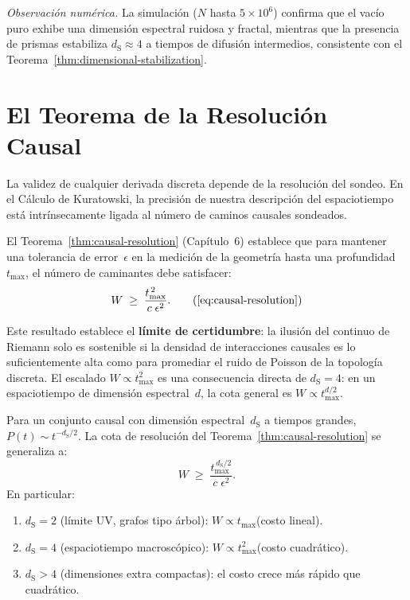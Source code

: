 \documentclass[11pt, a4paper, openany]{book}
\newcommand{\dS}{d_{\mathrm{S}}}
\begin{document}
\noindent\textit{Observaci\'on num\'erica.}\enspace
La simulaci\'on ($N$ hasta $5 \times 10^6$) confirma que el vac\'io
puro exhibe una dimensi\'on espectral ruidosa y fractal, mientras que
la presencia de prismas estabiliza $\dS \approx 4$ a tiempos de
difusi\'on intermedios, consistente con el
Teorema~\ref{thm:dimensional-stabilization}.

\section{El Teorema de la Resoluci\'on Causal}

La validez de cualquier derivada discreta depende de la resoluci\'on
del sondeo. En el C\'alculo de Kuratowski, la precisi\'on de nuestra
descripci\'on del espaciotiempo est\'a intr\'insecamente ligada al
n\'umero de caminos causales sondeados.

El Teorema~\ref{thm:causal-resolution} (Cap\'itulo~6) establece que
para mantener una tolerancia de error~$\epsilon$ en la medici\'on de
la geometr\'ia hasta una profundidad~$t_{\max}$, el n\'umero de
caminantes debe satisfacer:
\begin{equation}
  W \;\geq\; \frac{t_{\max}^{\,2}}{c\;\epsilon^2}.
  \tag{\ref{eq:causal-resolution}}
\end{equation}

\noindent
Este resultado establece el \textbf{l\'imite de certidumbre}:
la ilusi\'on del continuo de Riemann solo es sostenible si la densidad
de interacciones causales es lo suficientemente alta como para
promediar el ruido de Poisson de la topolog\'ia discreta. El escalado
$W \propto t_{\max}^2$ es una consecuencia directa de $\dS = 4$:
en un espaciotiempo de dimensi\'on espectral~$d$, la cota general
es $W \propto t_{\max}^{d/2}$.

\begin{theorem}
\label{thm:resolution-general}
Para un conjunto causal con dimensi\'on espectral~$\dS$ a tiempos
grandes, $P(t) \sim t^{-\dS/2}$. La cota de resoluci\'on del
Teorema~\ref{thm:causal-resolution} se generaliza a:
\begin{equation}
  W \;\geq\; \frac{t_{\max}^{\,\dS/2}}{c\;\epsilon^2}.
  \label{eq:resolution-general}
\end{equation}
En particular:
\begin{enumerate}
  \item $\dS = 2$ (l\'imite UV, grafos tipo \'arbol):
        $W \propto t_{\max}$\quad (costo lineal).
  \item $\dS = 4$ (espaciotiempo macrosc\'opico):
        $W \propto t_{\max}^2$\quad (costo cuadr\'atico).
  \item $\dS > 4$ (dimensiones extra compactas):
        el costo crece m\'as r\'apido que cuadr\'atico.
\end{enumerate}
\end{theorem}
\end{document}
